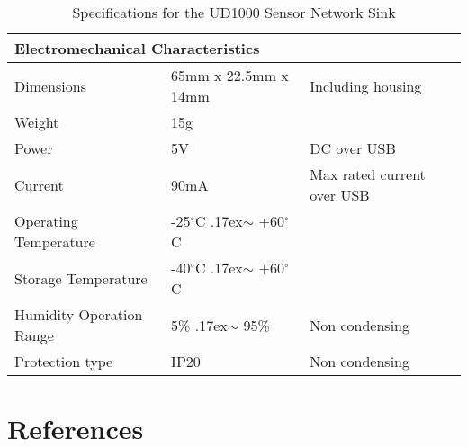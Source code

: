 \documentclass[a4paper]{article}
\newcommand{\mytilde}{\raise.17ex\hbox{$\scriptstyle\mathtt{\sim}$} }
\begin{document}
\begin{table}[H]
\begin{tabular}{| l | l | l |}
	\multicolumn{3}{|l|}{\textbf{Electromechanical Characteristics}} \\
	\hline
	Dimensions & 65mm x 22.5mm x 14mm & Including housing\\
	\hline
	Weight & 15g & ~\\
	\hline
	Power & 5V  & DC over USB\\
	\hline
	Current & 90mA  & Max rated current over USB\\
	\hline
	Operating Temperature & -25$^\circ$C \mytilde +60$^\circ$C & ~\\
	\hline
	Storage Temperature & -40$^\circ$C \mytilde +60$^\circ$C & ~\\
	\hline
	Humidity Operation Range & 5\% \mytilde 95\% & Non condensing\\
	\hline
	Protection type & IP20 & Non condensing\\
	\hline

	\end{tabular}
	\caption{Specifications for the UD1000 Sensor Network Sink \cite{UD1000}}
	\label{tab:UD1000-spec}
\end{table}


\section{References}
\renewcommand{\refname}{\vspace{-1cm}}


\end{document}
